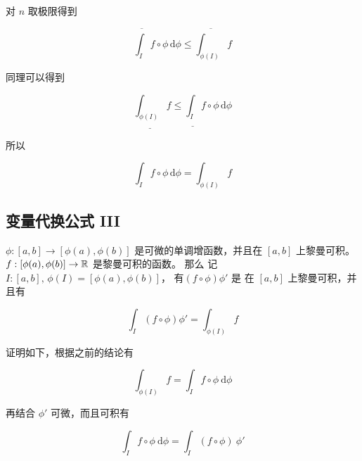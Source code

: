 对 $n$ 取极限得到

\[
\overline{\int_{I}}f \circ \phi \, \mathrm{d} \phi \le \overline{\int_{\phi(I)}}f
\]

同理可以得到


\[
\underline{\int_{\phi(I)}}f \le \underline{\int_{I}}f \circ \phi \, \mathrm{d} \phi
\]

所以

\[
\int_{I}f \circ \phi \, \mathrm{d} \phi = \int_{\phi(I)}f
\]


\subsection{变量代换公式 III}

$\phi: [a,b] \to [\phi(a), \phi(b)]$  是可微的单调增函数，并且在 $[a,b]$ 上黎曼可积。
$f: [\phi(a), \phi(b)] \to \mathbb{R}$ 是黎曼可积的函数。
那么 记 $I: [a,b],\, \phi(I) = [\phi(a), \phi(b)]$，
有$(f \circ \phi) \phi'$ 是 在 $[a,b]$ 上黎曼可积，并且有

\[
\int_{I}(f \circ \phi) \phi' = \int_{\phi(I)}f
\]

证明如下，根据之前的结论有

\[
\int_{\phi(I)} f = \int_{I} f \circ \phi \: \mathrm{d} \phi
\]

再结合 $\phi'$ 可微，而且可积有

\[
\int_{I} f \circ \phi \: \mathrm{d} \phi = \int_{I} (f \circ \phi) \: \phi'
\]